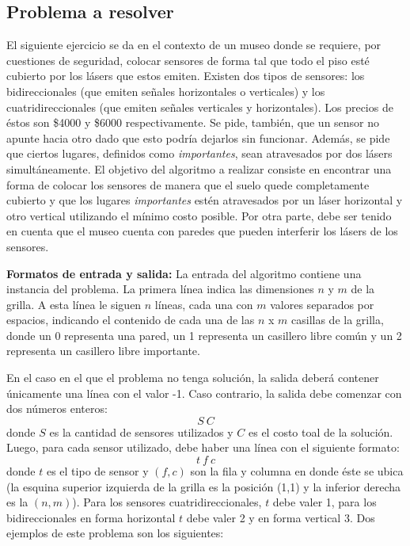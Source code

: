 \subsection{Problema a resolver}

El siguiente ejercicio se da en el contexto de un museo donde se requiere, por cuestiones de seguridad, colocar sensores de forma tal que todo el piso esté cubierto por los lásers que estos emiten. Existen dos tipos de sensores: los bidireccionales (que emiten señales horizontales o verticales) y los cuatridireccionales (que emiten señales verticales y horizontales). Los precios de éstos son \$4000 y \$6000 respectivamente. Se pide, también, que un sensor no apunte hacia otro dado que esto podría dejarlos sin funcionar. Además, se pide que ciertos lugares, definidos como \textit{importantes}, sean atravesados por dos lásers simultáneamente. El objetivo del algoritmo a realizar consiste en encontrar una forma de colocar los sensores de manera que el suelo quede completamente cubierto y que los lugares \textit{importantes} estén atravesados por un láser horizontal y otro vertical utilizando el mínimo costo posible. Por otra parte, debe ser tenido en cuenta que el museo cuenta con paredes que pueden interferir los lásers de los sensores.\newline

\newline
\textbf {Formatos de entrada y salida:}\newline
\newline
La entrada del algoritmo contiene una instancia del problema. La primera línea indica las dimensiones $n$ y $m$ de la grilla. A esta línea le siguen $n$ líneas, cada una con $m$ valores separados por espacios, indicando el contenido de cada una de las $n$ x $m$ casillas de la grilla, donde un 0 representa una pared, un 1 representa un casillero libre común y un 2 representa un casillero libre importante.\newline

En el caso en el que el problema no tenga solución, la salida deberá contener únicamente una línea con el valor -1. Caso contrario, la salida debe comenzar con dos números enteros: 
$$S\ C$$ 
donde $S$ es la cantidad de sensores utilizados y $C$ es el costo toal de la solución. Luego, para cada sensor utilizado, debe haber una línea con el siguiente formato: 
$$t\ f\ c$$ 
donde $t$ es el tipo de sensor y $(f,c)$ son la fila y columna en donde éste se ubica (la esquina superior izquierda de la grilla es la posición (1,1) y la inferior derecha es la $(n,m)$). Para los sensores cuatridireccionales, $t$ debe valer 1, para los bidireccionales en forma horizontal $t$ debe valer 2 y en forma vertical 3.\newline
\newline
Dos ejemplos de este problema son los siguientes:

